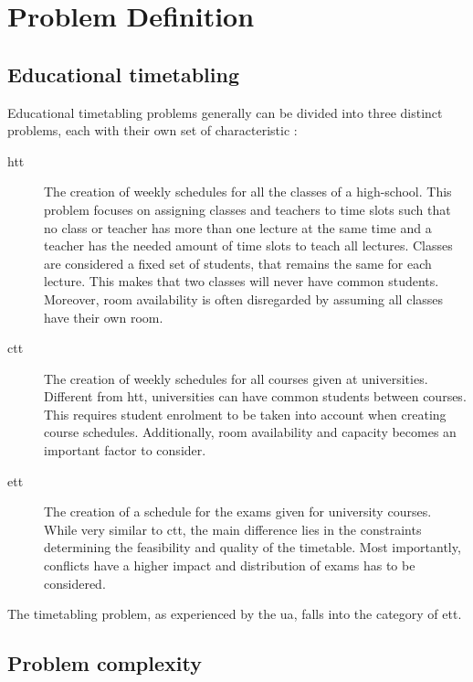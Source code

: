
\section{Problem Definition}\label{sec:problem}

\subsection{Educational timetabling}
Educational timetabling problems generally can be divided into three distinct problems, each with their own set of characteristic \cite{schaerf1996} \cite{kingston2013}:

\begin{description}
   \item [\acrfull{htt}] The creation of weekly schedules for all the classes of a high-school. This problem focuses on assigning classes and teachers to time slots such that no class or teacher has more than one lecture at the same time and a teacher has the needed amount of time slots to teach all lectures. Classes are considered a fixed set of students, that remains the same for each lecture. This makes that two classes will never have common students. Moreover, room availability is often disregarded by assuming all classes have their own room.
   \item [\acrfull{ctt}] The creation of weekly schedules for all courses given at universities. Different from \acrshort{htt}, universities can have common students between courses. This requires student enrolment to be taken into account when creating course schedules. Additionally, room availability and capacity becomes an important factor to consider.
   \item [\acrfull{ett}] The creation of a schedule for the exams given for university courses. While very similar to \acrshort{ctt}, the main difference lies in the constraints determining the feasibility and quality of the timetable. Most importantly, conflicts have a higher impact and distribution of exams has to be considered.
\end{description}

The timetabling problem, as experienced by the \acrfull{ua}, falls into the category of \acrshort{ett}. 

\subsection{Problem complexity}

